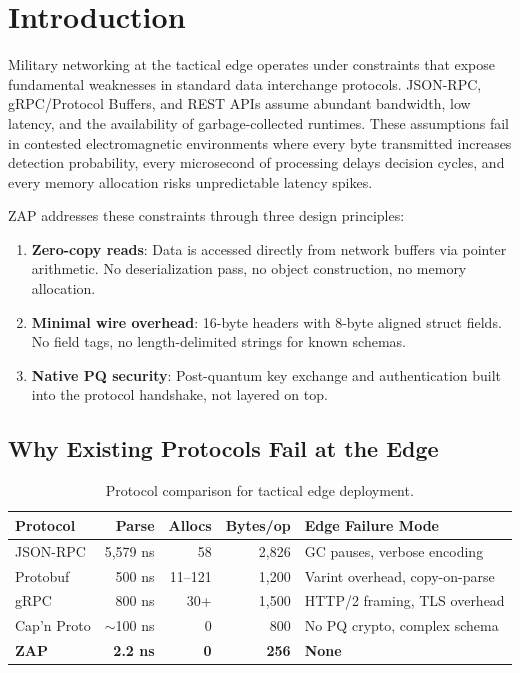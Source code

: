 \documentclass[11pt,letterpaper]{article}
\begin{document}
\tableofcontents
\newpage

\section{Introduction}

Military networking at the tactical edge operates under constraints that expose fundamental weaknesses in standard data interchange protocols. JSON-RPC, gRPC/Protocol Buffers, and REST APIs assume abundant bandwidth, low latency, and the availability of garbage-collected runtimes. These assumptions fail in contested electromagnetic environments where every byte transmitted increases detection probability, every microsecond of processing delays decision cycles, and every memory allocation risks unpredictable latency spikes.

ZAP addresses these constraints through three design principles:

\begin{enumerate}
\item \textbf{Zero-copy reads}: Data is accessed directly from network buffers via pointer arithmetic. No deserialization pass, no object construction, no memory allocation.
\item \textbf{Minimal wire overhead}: 16-byte headers with 8-byte aligned struct fields. No field tags, no length-delimited strings for known schemas.
\item \textbf{Native PQ security}: Post-quantum key exchange and authentication built into the protocol handshake, not layered on top.
\end{enumerate}

\subsection{Why Existing Protocols Fail at the Edge}

\begin{table}[H]
\centering
\small
\begin{tabular}{@{}lrrrp{3cm}@{}}
\toprule
\textbf{Protocol} & \textbf{Parse} & \textbf{Allocs} & \textbf{Bytes/op} & \textbf{Edge Failure Mode} \\
\midrule
JSON-RPC & 5,579 ns & 58 & 2,826 & GC pauses, verbose encoding \\
Protobuf & 500 ns & 11--121 & 1,200 & Varint overhead, copy-on-parse \\
gRPC & 800 ns & 30+ & 1,500 & HTTP/2 framing, TLS overhead \\
Cap'n Proto & $\sim$100 ns & 0 & 800 & No PQ crypto, complex schema \\
\textbf{ZAP} & \textbf{2.2 ns} & \textbf{0} & \textbf{256} & \textbf{None} \\
\bottomrule
\end{tabular}
\caption{Protocol comparison for tactical edge deployment.}
\label{tab:protocol-comparison}
\end{table}
\end{document}
